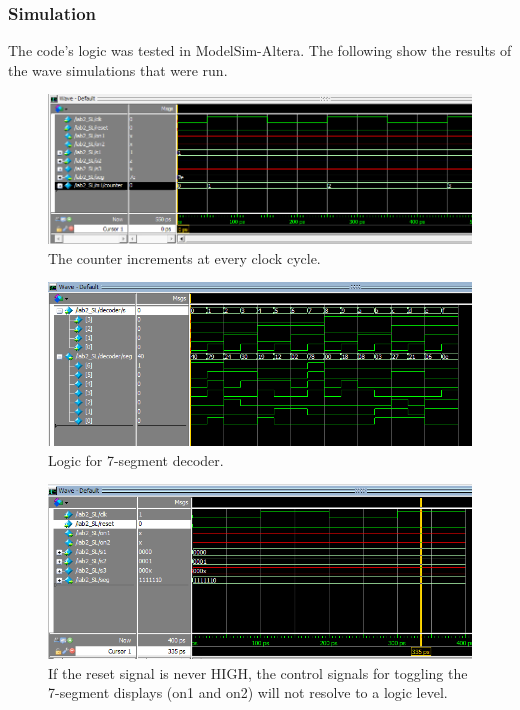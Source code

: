 \documentclass[11pt]{article}
\begin{document}
\label{sec:software_LEDbar}

\clearpage


\subsubsection{Simulation}

The code's logic was tested in ModelSim-Altera. The following show the results of the wave simulations that were run.

\begin{figure}[h!]
\centering
\includegraphics[scale=0.65]{clk_works.png}
\caption{The counter increments at every clock cycle.}
\label{fig:wave_clk}
\end{figure} 


\begin{figure}[h!]
\centering
\includegraphics[scale=0.7]{mux_all.png}
\caption{Logic for 7-segment decoder.}
\label{fig:wave_mux}
\end{figure} 


\begin{figure}[h!]
\centering
\includegraphics[scale=0.75]{no_reset.png}
\caption{If the reset signal is never HIGH, the control signals for toggling the 7-segment displays (on1 and on2) will not resolve to a logic level.}
\label{fig:wave_reset_no}
\end{figure} 
\end{document}

